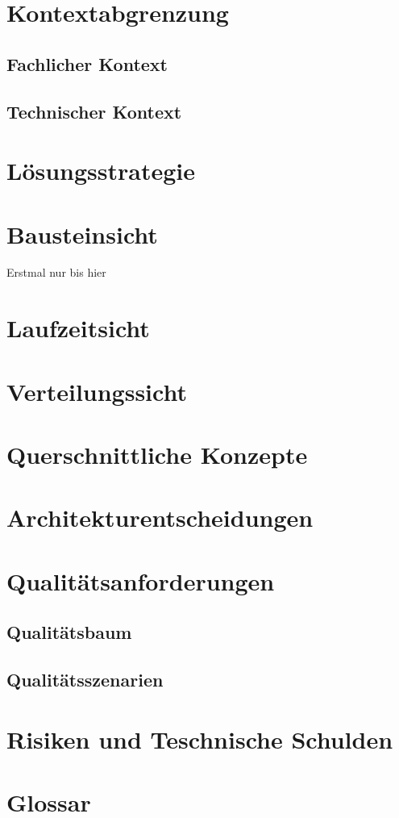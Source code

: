 \documentclass[
]{article}
\begin{document}
\section{Kontextabgrenzung}
\subsection{Fachlicher Kontext}
\subsection{Technischer Kontext}

\section{Lösungsstrategie}

\section{Bausteinsicht}
Erstmal nur bis hier

\section{Laufzeitsicht}

\section{Verteilungssicht}

\section{Querschnittliche Konzepte}

\section{Architekturentscheidungen}

\section{Qualitätsanforderungen}
\subsection{Qualitätsbaum}
\subsection{Qualitätsszenarien}

\section{Risiken und Teschnische Schulden}
\section{Glossar}
\end{document}
